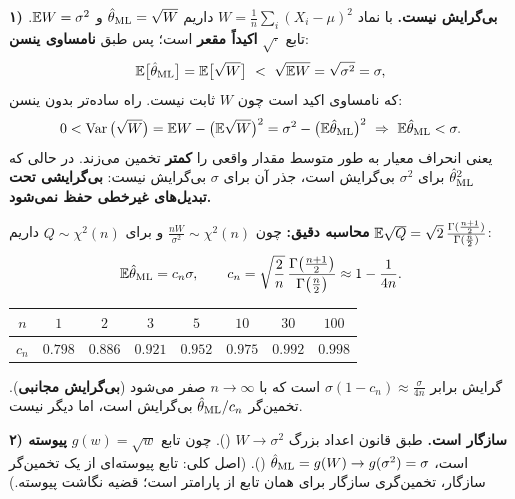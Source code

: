 \begin{question}
\begin{answer}
\textbf{۱) بی‌گرایش نیست.} با نماد $W=\frac1n\sum_i(X_i-\mu)^2$ داریم $\hat\theta_{\mathrm{ML}}=\sqrt W$ و $\mathbb{E} W=\sigma^2$. تابع $\sqrt{\cdot}$ \textbf{اکیداً مقعر} است؛ پس طبق \textbf{نامساوی ینسن}:
\[
\mathbb{E}\big[\hat\theta_{\mathrm{ML}}\big]=\mathbb{E}\big[\sqrt W\big]\ <\ \sqrt{\mathbb{E} W}=\sqrt{\sigma^2}=\sigma ,
\]
که نامساوی اکید است چون $W$ ثابت نیست. راه ساده‌تر بدون ینسن:
\[
0<\Var\big(\sqrt W\big)=\E W-\big(\E\sqrt W\big)^2=\sigma^2-\big(\E\hat\theta_\ML\big)^2\ \Rightarrow\ \E\hat\theta_\ML<\sigma .
\]
یعنی  انحراف معیار به طور متوسط مقدار واقعی را \textbf{کمتر} تخمین می‌زند. در حالی که $\hat\theta_{\mathrm{ML}}^2$ برای $\sigma^2$ بی‌گرایش است، جذر آن برای $\sigma$ بی‌گرایش نیست: \textbf{بی‌گرایشی تحت تبدیل‌های غیرخطی حفظ نمی‌شود.}

\textbf{محاسبه دقیق:} چون $\frac{nW}{\sigma^2}\sim\chi^2(n)$ و برای $Q\sim\chi^2(n)$ داریم $\mathbb{E}\sqrt Q=\sqrt2\,\frac{\Gamma(\frac{n+1}2)}{\Gamma(\frac n2)}$:
\[
\mathbb{E}\hat\theta_{\mathrm{ML}}=c_n\sigma,\qquad c_n=\sqrt{\frac2n}\,\frac{\Gamma\big(\frac{n+1}{2}\big)}{\Gamma\big(\frac n2\big)}\approx1-\frac{1}{4n}.
\]
\begin{center}
\renewcommand{\arraystretch}{1.3}
\begin{tabular}{c|ccccccc}
$n$ & $1$ & $2$ & $3$ & $5$ & $10$ & $30$ & $100$\\\hline
$c_n$ & $0.798$ & $0.886$ & $0.921$ & $0.952$ & $0.975$ & $0.992$ & $0.998$
\end{tabular}
\end{center}
گرایش برابر $\sigma(1-c_n)\approx\frac{\sigma}{4n}$ است که با $n\to\infty$ صفر می‌شود (\textbf{بی‌گرایش مجانبی}). تخمین‌گر $\hat\theta_{\mathrm{ML}}/c_n$ بی‌گرایش است، اما دیگر  نیست.

\textbf{۲) سازگار است.} طبق قانون اعداد بزرگ $W\to\sigma^2$ (). چون تابع $g(w)=\sqrt w$ \textbf{پیوسته} است، $\hat\theta_{\mathrm{ML}}=g(W)\to g(\sigma^2)=\sigma$ (). (اصل کلی: تابع پیوسته‌ای از یک تخمین‌گر سازگار، تخمین‌گری سازگار برای همان تابع از پارامتر است؛ قضیه نگاشت پیوسته.)
\end{answer}
\end{question}

